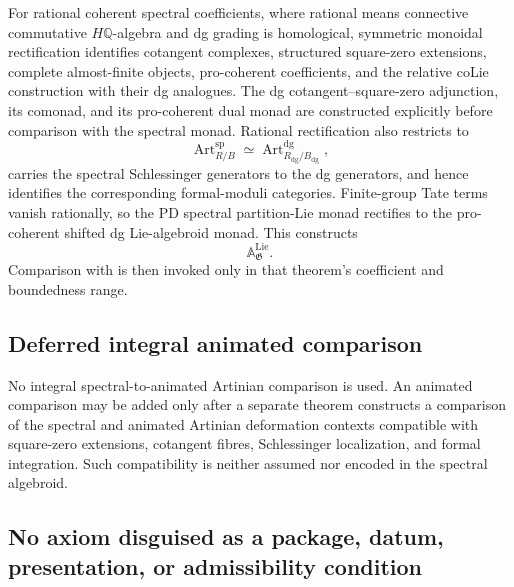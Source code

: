 For rational coherent spectral coefficients, where rational means connective
commutative $H\mathbb Q$-algebra and dg grading is homological, symmetric
monoidal rectification identifies cotangent complexes, structured square-zero
extensions, complete almost-finite objects, pro-coherent coefficients, and the
relative coLie construction with their dg analogues.  The dg
cotangent--square-zero adjunction, its comonad, and its pro-coherent dual monad
are constructed explicitly before comparison with the spectral monad.  Rational
rectification also restricts to
\[
    \operatorname{Art}^{\mathrm{sp}}_{R/B}
    \simeq
    \operatorname{Art}^{\mathrm{dg}}_{R_{\mathrm{dg}}/B_{\mathrm{dg}}},
\]
carries the spectral Schlessinger generators to the dg generators, and hence
identifies the corresponding formal-moduli categories.  Finite-group Tate
terms vanish rationally, so the PD spectral partition-Lie monad rectifies to
the pro-coherent shifted dg Lie-algebroid monad.  This constructs
\[
    \mathbb A^{\mathrm{Lie}}_{\mathfrak G}.
\]
Comparison with \cite{Nuiten2019} is then invoked only in that theorem's
coefficient and boundedness range.

\subsection{Deferred integral animated comparison}

No integral spectral-to-animated Artinian comparison is used.  An animated
comparison may be added only after a separate theorem constructs a comparison
of the spectral and animated Artinian deformation contexts compatible with
square-zero extensions, cotangent fibres, Schlessinger localization, and
formal integration.  Such compatibility is neither assumed nor encoded in
the spectral algebroid.

\subsection{No axiom disguised as a package, datum, presentation, or admissibility condition}


